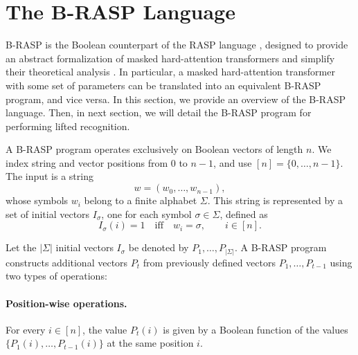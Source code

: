\section{The B-RASP Language}
\label{app:brasp}

B-RASP is the Boolean counterpart of the RASP language
\citep{rasp}, designed to provide an abstract formalization of
masked hard-attention transformers and simplify their theoretical
analysis \citep{yang2024masked}. In particular, a masked hard-attention
transformer with some set of parameters can be translated into an equivalent B-RASP
program, and vice versa.
In this section, we provide an overview of the B-RASP language. Then, in next section, we will detail the B-RASP program for performing lifted \strips recognition.

A B-RASP program operates
exclusively on Boolean vectors of length $n$. We index string and vector
positions from $0$ to $n-1$, and use $[n] = \{0,\ldots,n-1\}$. The input is a
string
\[
w = (w_0,\ldots,w_{n-1}),
\]
whose symbols $w_i$ belong to a finite alphabet $\Sigma$. This string is
represented by a set of initial vectors $I_\sigma$, one for each symbol $\sigma\in\Sigma$, defined as
\[
I_\sigma(i)=1
\quad\text{iff}\quad
w_i=\sigma,
\qquad i\in[n].
\]

Let the $|\Sigma|$ initial vectors $I_\sigma$ be denoted by
$P_1,\ldots,P_{|\Sigma|}$. A B-RASP program constructs additional vectors
$P_t$ from previously defined vectors $P_1,\ldots,P_{t-1}$ using two types of
operations:

\paragraph{Position-wise operations.}
For every $i\in[n]$, the value $P_t(i)$ is given by a Boolean function of
the values $\{P_1(i),\ldots,P_{t-1}(i)\}$ at the same position $i$.

